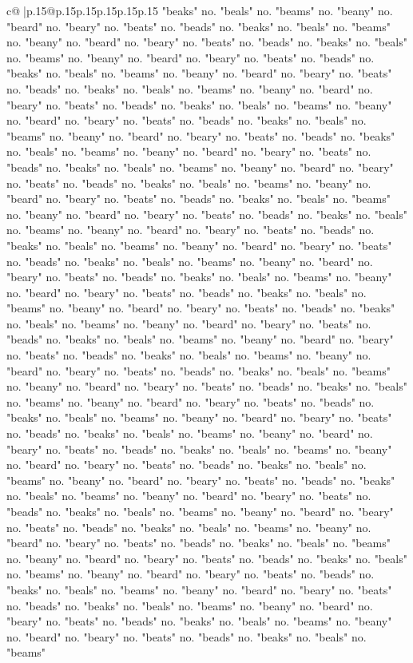 \documentclass{article}
\begin{document}
{\begin{supertabular}{c@{$\;$}|p{.15\linewidth}@{}p{.15\linewidth}p{.15\linewidth}p{.15\linewidth}p{.15\linewidth}p{.15\linewidth}}
{{{"beaks" no. "beals" no. "beams" no. "beany" no. "beard" no. "beary" no. "beats" no. "beads" no. "beaks" no. "beals" no. "beams" no. "beany" no. "beard" no. "beary" no. "beats" no. "beads" no. "beaks" no. "beals" no. "beams" no. "beany" no. "beard" no. "beary" no. "beats" no. "beads" no. "beaks" no. "beals" no. "beams" no. "beany" no. "beard" no. "beary" no. "beats" no. "beads" no. "beaks" no. "beals" no. "beams" no. "beany" no. "beard" no. "beary" no. "beats" no. "beads" no. "beaks" no. "beals" no. "beams" no. "beany" no. "beard" no. "beary" no. "beats" no. "beads" no. "beaks" no. "beals" no. "beams" no. "beany" no. "beard" no. "beary" no. "beats" no. "beads" no. "beaks" no. "beals" no. "beams" no. "beany" no. "beard" no. "beary" no. "beats" no. "beads" no. "beaks" no. "beals" no. "beams" no. "beany" no. "beard" no. "beary" no. "beats" no. "beads" no. "beaks" no. "beals" no. "beams" no. "beany" no. "beard" no. "beary" no. "beats" no. "beads" no. "beaks" no. "beals" no. "beams" no. "beany" no. "beard" no. "beary" no. "beats" no. "beads" no. "beaks" no. "beals" no. "beams" no. "beany" no. "beard" no. "beary" no. "beats" no. "beads" no. "beaks" no. "beals" no. "beams" no. "beany" no. "beard" no. "beary" no. "beats" no. "beads" no. "beaks" no. "beals" no. "beams" no. "beany" no. "beard" no. "beary" no. "beats" no. "beads" no. "beaks" no. "beals" no. "beams" no. "beany" no. "beard" no. "beary" no. "beats" no. "beads" no. "beaks" no. "beals" no. "beams" no. "beany" no. "beard" no. "beary" no. "beats" no. "beads" no. "beaks" no. "beals" no. "beams" no. "beany" no. "beard" no. "beary" no. "beats" no. "beads" no. "beaks" no. "beals" no. "beams" no. "beany" no. "beard" no. "beary" no. "beats" no. "beads" no. "beaks" no. "beals" no. "beams" no. "beany" no. "beard" no. "beary" no. "beats" no. "beads" no. "beaks" no. "beals" no. "beams" no. "beany" no. "beard" no. "beary" no. "beats" no. "beads" no. "beaks" no. "beals" no. "beams" no. "beany" no. "beard" no. "beary" no. "beats" no. "beads" no. "beaks" no. "beals" no. "beams" no. "beany" no. "beard" no. "beary" no. "beats" no. "beads" no. "beaks" no. "beals" no. "beams" no. "beany" no. "beard" no. "beary" no. "beats" no. "beads" no. "beaks" no. "beals" no. "beams" no. "beany" no. "beard" no. "beary" no. "beats" no. "beads" no. "beaks" no. "beals" no. "beams" no. "beany" no. "beard" no. "beary" no. "beats" no. "beads" no. "beaks" no. "beals" no. "beams" no. "beany" no. "beard" no. "beary" no. "beats" no. "beads" no. "beaks" no. "beals" no. "beams" no. "beany" no. "beard" no. "beary" no. "beats" no. "beads" no. "beaks" no. "beals" no. "beams" no. "beany" no. "beard" no. "beary" no. "beats" no. "beads" no. "beaks" no. "beals" no. "beams" no. "beany" no. "beard" no. "beary" no. "beats" no. "beads" no. "beaks" no. "beals" no. "beams" no. "beany" no. "beard" no. "beary" no. "beats" no. "beads" no. "beaks" no. "beals" no. "beams" no. "beany" no. "beard" no. "beary" no. "beats" no. "beads" no. "beaks" no. "beals" no. "beams" no. "beany" no. "beard" no. "beary" no. "beats" no. "beads" no. "beaks" no. "beals" no. "beams" no. "beany" no. "beard" no. "beary" no. "beats" no. "beads" no. "beaks" no. "beals" no. "beams" }}}
\end{supertabular}}
\end{document}
